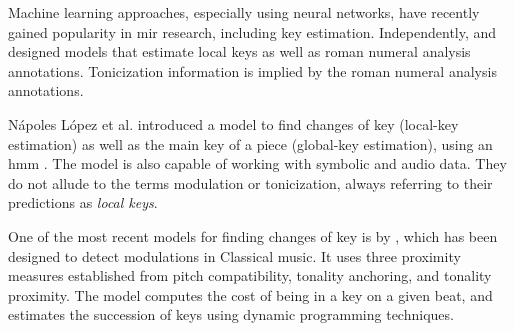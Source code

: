 Machine learning approaches, especially using neural
networks, have recently gained popularity in \gls{mir}
research, including key estimation. Independently,
\textcite{chen2018functional, chen2019harmony} and
\textcite{micchi2020not} designed models that estimate local
keys as well as roman numeral analysis annotations.
Tonicization information is implied by the roman numeral
analysis annotations.

N\'apoles L\'opez et al. introduced a model to find changes
of key (local-key estimation) as well as the main key of a
piece (global-key estimation), using an \gls{hmm}
\textcite{napoleslopez2019keyfinding}. The model is also
capable of working with symbolic and audio data. They do not
allude to the terms modulation or tonicization, always
referring to their predictions as \emph{local keys}.

One of the most recent models for finding changes of key is
by \textcite{feisthauer2020estimating}, which has been
designed to detect modulations in Classical music. It uses
three proximity measures established from pitch
compatibility, tonality anchoring, and tonality proximity.
The model computes the cost of being in a key on a given
beat, and estimates the succession of keys using dynamic
programming techniques.
